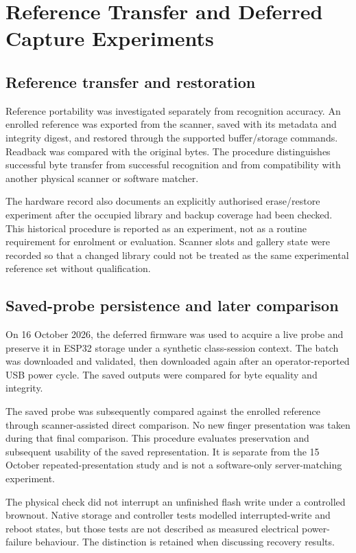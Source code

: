 \section{Reference Transfer and Deferred Capture Experiments}\label{sec:3-12}

\subsection{Reference transfer and restoration}\label{sec:3-12-1}

Reference portability was investigated separately from recognition accuracy. An enrolled reference was exported from the scanner, saved with its metadata and integrity digest, and restored through the supported buffer/storage commands. Readback was compared with the original bytes. The procedure distinguishes successful byte transfer from successful recognition and from compatibility with another physical scanner or software matcher.

The hardware record also documents an explicitly authorised erase/restore experiment after the occupied library and backup coverage had been checked. This historical procedure is reported as an experiment, not as a routine requirement for enrolment or evaluation. Scanner slots and gallery state were recorded so that a changed library could not be treated as the same experimental reference set without qualification.

\subsection{Saved-probe persistence and later comparison}\label{sec:3-12-2}

On 16 October 2026, the deferred firmware was used to acquire a live probe and preserve it in ESP32 storage under a synthetic class-session context. The batch was downloaded and validated, then downloaded again after an operator-reported USB power cycle. The saved outputs were compared for byte equality and integrity.

The saved probe was subsequently compared against the enrolled reference through scanner-assisted direct comparison. No new finger presentation was taken during that final comparison. This procedure evaluates preservation and subsequent usability of the saved representation. It is separate from the 15 October repeated-presentation study and is not a software-only server-matching experiment.

The physical check did not interrupt an unfinished flash write under a controlled brownout. Native storage and controller tests modelled interrupted-write and reboot states, but those tests are not described as measured electrical power-failure behaviour. The distinction is retained when discussing recovery results.

